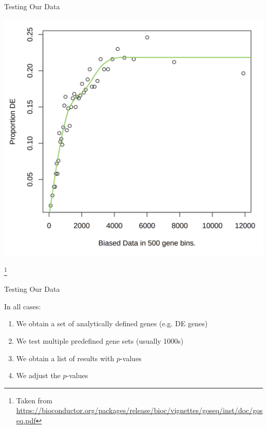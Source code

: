 \documentclass[aspectratio=169,11pt]{beamer}
\newcommand\blfootnote[1]{%
  \begingroup
  \renewcommand\thefootnote{}\footnote{#1}%
  \addtocounter{footnote}{-1}%
  \endgroup
}
\begin{document}
\begin{frame}{Testing Our Data}

	\begin{center}
		\includegraphics[width=0.47\linewidth]{figures/pwfLength.png} 
	\end{center}		
	
	\blfootnote{Taken from \url{https://bioconductor.org/packages/release/bioc/vignettes/goseq/inst/doc/goseq.pdf}}	
	
\end{frame}

\begin{frame}{Testing Our Data}

In all cases:

	\begin{enumerate}
		\item We obtain a set of analytically defined genes (e.g. DE genes)
		\item We test multiple predefined gene sets (usually 1000s)
		\item We obtain a list of results with $p$-values
		\item We adjust the $p$-values
	\end{enumerate}
	
\end{frame}
\end{document}
